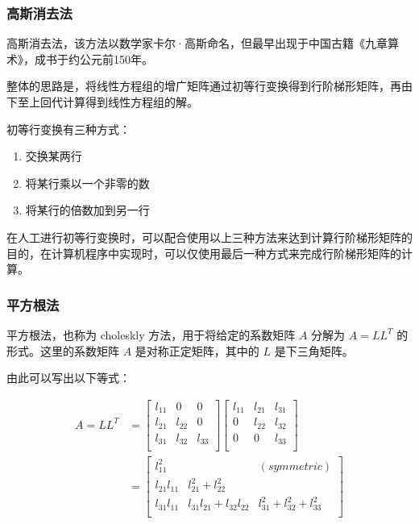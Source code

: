 \subsubsection{高斯消去法}

高斯消去法，该方法以数学家卡尔·高斯命名，但最早出现于中国古籍《九章算术》，成书于约公元前150年。

整体的思路是，将线性方程组的增广矩阵通过初等行变换得到行阶梯形矩阵，再由下至上回代计算得到线性方程组的解。

初等行变换有三种方式：

\begin{enumerate}
    \item 交换某两行
    \item 将某行乘以一个非零的数
    \item 将某行的倍数加到另一行
\end{enumerate}

在人工进行初等行变换时，可以配合使用以上三种方法来达到计算行阶梯形矩阵的目的，在计算机程序中实现时，可以仅使用最后一种方式来完成行阶梯形矩阵的计算。


\subsubsection{平方根法}

平方根法，也称为 choleskly 方法，用于将给定的系数矩阵 \(A\) 分解为
\(A = L L^T\) 的形式。这里的系数矩阵 \(A\) 是对称正定矩阵，其中的 \(L\)
是下三角矩阵。

由此可以写出以下等式： 

\begin{equation*}
    \begin{aligned}
        A = LL^T & =
        \begin{bmatrix}
            l_{11} & 0      & 0      \\
            l_{21} & l_{22} & 0      \\
            l_{31} & l_{32} & l_{33} \\
        \end{bmatrix}
        \begin{bmatrix}
            l_{11} & l_{21} & l_{31} \\
            0      & l_{22} & l_{32} \\
            0      & 0      & l_{33} \\
        \end{bmatrix} \\
                      & =
        \begin{bmatrix}
            l_{11}^2     &                             & (symmetric)                     \\
            l_{21}l_{11} & l_{21}^2 + l_{22}^2                                           \\
            l_{31}l_{11} & l_{31}l_{21} + l_{32}l_{22} & l_{31}^2 + l_{32}^2 + l_{33} ^2 \\
        \end{bmatrix}
    \end{aligned}
\end{equation*}


